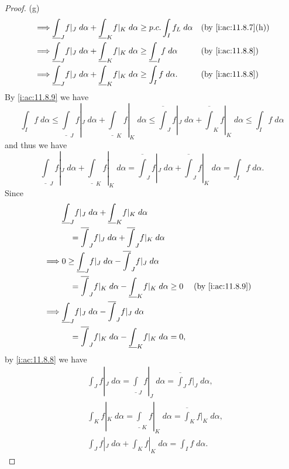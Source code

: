 \begin{proof}{(g)}
\begin{align*}
    \implies & \underline{\int}_J f|_J \; d \alpha + \underline{\int}_K f|_K \; d \alpha \geq p.c. \int_I f_L \; d \alpha      &  & \by{i:ac:11.8.7}[h] \\
    \implies & \underline{\int}_J f|_J \; d \alpha + \underline{\int}_K f|_K \; d \alpha \geq \underline{\int}_I f \; d \alpha &  & \by{i:ac:11.8.8}    \\
    \implies & \underline{\int}_J f|_J \; d \alpha + \underline{\int}_K f|_K \; d \alpha \geq \int_I f \; d \alpha.            &  & \by{i:ac:11.8.8}
  \end{align*}
  By \cref{i:ac:11.8.9} we have
  \[
    \int_I f \; d \alpha \leq \underline{\int}_J f|_J \; d \alpha + \underline{\int}_K f|_K \; d \alpha \leq \overline{\int}_J f|_J \; d \alpha + \overline{\int}_K f|_K \; d \alpha \leq \int_I f \; d \alpha
  \]
  and thus we have
  \[
    \underline{\int}_J f|_J \; d \alpha + \underline{\int}_K f|_K \; d \alpha = \overline{\int}_J f|_J \; d \alpha + \overline{\int}_J f|_K \; d \alpha = \int_I f \; d \alpha.
  \]
  Since
  \begin{align*}
             & \underline{\int}_J f|_J \; d \alpha + \underline{\int}_K f|_K \; d \alpha                                     \\
             & \quad = \overline{\int}_J f|_J \; d \alpha + \overline{\int}_J f|_K \; d \alpha                               \\
    \implies & 0 \geq \underline{\int}_J f|_J \; d \alpha - \overline{\int}_J f|_J \; d \alpha                               \\
             & \quad = \overline{\int}_J f|_K \; d \alpha - \underline{\int}_K f|_K \; d \alpha \geq 0 &  & \by{i:ac:11.8.9} \\
    \implies & \underline{\int}_J f|_J \; d \alpha - \overline{\int}_J f|_J \; d \alpha                                      \\
             & \quad = \overline{\int}_J f|_K \; d \alpha - \underline{\int}_K f|_K \; d \alpha = 0,
  \end{align*}
  by \cref{i:ac:11.8.8} we have
  \begin{align*}
     & \int_J f|_J \; d \alpha = \underline{\int}_J f|_J \; d \alpha = \overline{\int}_J f|_J \; d \alpha, \\
     & \int_K f|_K \; d \alpha = \underline{\int}_K f|_K \; d \alpha = \overline{\int}_K f|_K \; d \alpha, \\
     & \int_J f|_J \; d \alpha + \int_K f|_K \; d \alpha = \int_I f \; d \alpha.
  \end{align*}
\end{proof}


